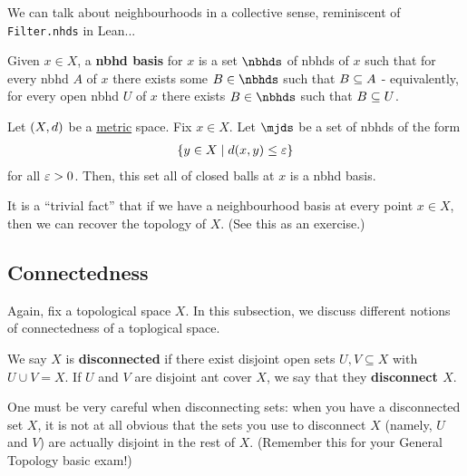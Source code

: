 We can talk about neighbourhoods in a collective sense, reminiscent of \verb|Filter.nhds| in Lean...

\begin{boxdefinition}
    Given $x\in X$, a \textbf{nbhd basis} for $x$ is a set $\nbhds$ of nbhds of $x$ such that for every nbhd $A$ of $x$ there exists some $B \in \nbhds$ such that $B\subseteq A$ - equivalently, for every open nbhd $U$ of $x$ there exists $B\in \nbhds$ such that $B\subseteq U$.
\end{boxdefinition}%


\begin{boxexample}
    Let $\left( X, d \right)$ be a \underline{metric} space. Fix $x \in X$. Let $\mjds$ be a set of nbhds of the form
    \begin{align*}
        \left\{ y \in X \; \middle\vert \; d\!\left( x, y \right) \leq \varepsilon \right\}
    \end{align*}
    for all $\varepsilon > 0$. Then, this set all of closed balls at $x$ is a nbhd basis. %
\end{boxexample}%
\begin{remark}
    It is a ``trivial fact'' that if we have a neighbourhood basis at every point $x\in X$, then we can recover the topology of $X$. (See this as an exercise.)
\end{remark}

\subsection{Connectedness}

Again, fix a topological space $X$. In this subsection, we discuss different notions of connectedness of a toplogical space.

\begin{boxdefinition}[Disconnectedness]
    We say $X$ is \textbf{disconnected} if there exist disjoint open sets $U, V \subseteq X$ with $U \cup V = X$. If $U$ and $V$ are disjoint ant cover $X$, we say that they \textbf{disconnect $X$}.
\end{boxdefinition}
\begin{remark}
    One must be very careful when disconnecting sets: when you have a disconnected set $X$, it is not at all obvious that the sets you use to disconnect $X$ (namely, $U$ and $V$) are actually disjoint in the rest of $X$. (Remember this for your General Topology basic exam!)
\end{remark}

